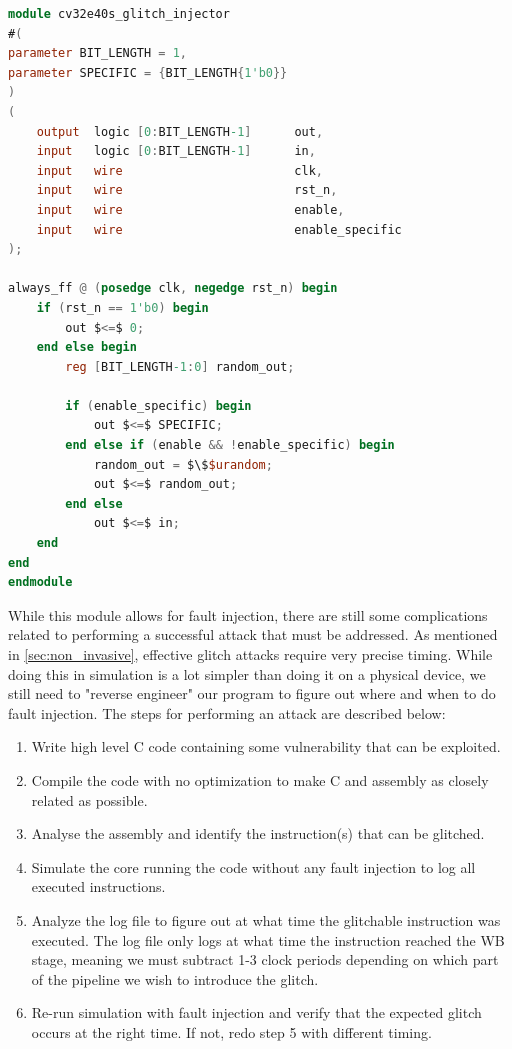 \begin{lstlisting}[caption={SystemVerilog code for the glitch\_injector module}, label=lst:glitch_injector, language=verilog]
module cv32e40s_glitch_injector 
#(
parameter BIT_LENGTH = 1, 
parameter SPECIFIC = {BIT_LENGTH{1'b0}}
)
(
    output  logic [0:BIT_LENGTH-1]      out,            
    input   logic [0:BIT_LENGTH-1]      in,
    input   wire                        clk,
    input   wire                        rst_n,
    input   wire                        enable,         
    input   wire                        enable_specific
);

always_ff @ (posedge clk, negedge rst_n) begin 
    if (rst_n == 1'b0) begin 
        out $<=$ 0;
    end else begin
        reg [BIT_LENGTH-1:0] random_out;            

        if (enable_specific) begin
            out $<=$ SPECIFIC;
        end else if (enable && !enable_specific) begin
            random_out = $\$$urandom;
            out $<=$ random_out; 
        end else
            out $<=$ in;  
    end
end
endmodule
\end{lstlisting}

While this module allows for fault injection, there are still some complications related to performing a successful attack that must be addressed. As mentioned in \autoref{sec:non_invasive}, effective glitch attacks require very precise timing. While doing this in simulation is a lot simpler than doing it on a physical device, we still need to "reverse engineer" our program to figure out where and when to do fault injection. The steps for performing an attack are described below:

\begin{enumerate}
    \item Write high level C code containing some vulnerability that can be exploited. 
    \item Compile the code with no optimization to make C and assembly as closely related as possible.
    \item Analyse the assembly and identify the instruction(s) that can be glitched.
    \item Simulate the core running the code without any fault injection to log all executed instructions. 
    \item Analyze the log file to figure out at what time the glitchable instruction was executed. The log file only logs at what time the instruction reached the WB stage, meaning we must subtract 1-3 clock periods depending on which part of the pipeline we wish to introduce the glitch. 
    \item Re-run simulation with fault injection and verify that the expected glitch occurs at the right time. If not, redo step 5 with different timing. 
\end{enumerate}

